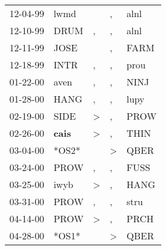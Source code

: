 \begin{supertabular}{p{0.07\textwidth}p{0.06\textwidth}p{0.02\textwidth}p{0.02\textwidth}p{0.06\textwidth}}
          12-04-99\textsuperscript{} &           lwmd\textsuperscript{} &                  &                , &           alnl\textsuperscript{} \\
          12-10-99\textsuperscript{} &           DRUM\textsuperscript{} &                , &                , &           alnl\textsuperscript{} \\
          12-11-99\textsuperscript{} &           JOSE\textsuperscript{} &                  &                , &           FARM\textsuperscript{} \\
          12-18-99\textsuperscript{} &           INTR\textsuperscript{} &                , &                , &           prou\textsuperscript{} \\
          01-22-00\textsuperscript{} &           aven\textsuperscript{} &                , &                , &           NINJ\textsuperscript{} \\
          01-28-00\textsuperscript{} &           HANG\textsuperscript{} &                , &                , &           lupy\textsuperscript{} \\
          02-19-00\textsuperscript{} &           SIDE\textsuperscript{} &     \textgreater &                , &           PROW\textsuperscript{} \\
          02-26-00\textsuperscript{} &  \textbf{cais\textsuperscript{}} &     \textgreater &                , &           THIN\textsuperscript{} \\
          03-04-00\textsuperscript{} &                            *OS2* &                  &     \textgreater &           QBER\textsuperscript{} \\
          03-24-00\textsuperscript{} &           PROW\textsuperscript{} &                , &                , &           FUSS\textsuperscript{} \\
          03-25-00\textsuperscript{} &           iwyb\textsuperscript{} &     \textgreater &                , &           HANG\textsuperscript{} \\
          03-31-00\textsuperscript{} &           PROW\textsuperscript{} &                , &                , &           stru\textsuperscript{} \\
          04-14-00\textsuperscript{} &           PROW\textsuperscript{} &     \textgreater &                , &           PRCH\textsuperscript{} \\
          04-28-00\textsuperscript{} &                            *OS1* &                  &     \textgreater &           QBER\textsuperscript{} \\

\end{supertabular}
